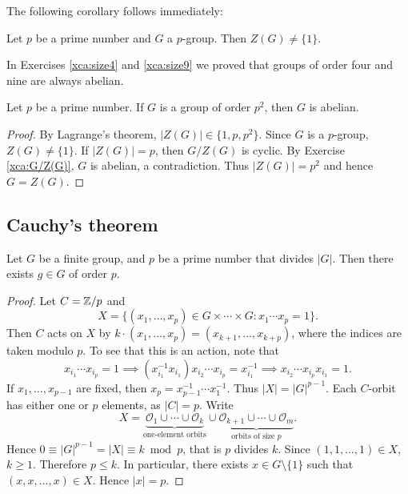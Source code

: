 The following corollary follows immediately: 

\begin{corollary}
Let $p$ be a prime number and 
$G$ a $p$-group. Then 
$Z(G)\ne\{1\}$.
\end{corollary}

In Exercises \ref{xca:size4} and \ref{xca:size9}
we proved that groups of order four and nine are always abelian. 

\begin{corollary}
    Let $p$ be a prime number. If $G$ is a group of order $p^2$, 
    then $G$ is abelian. 
\end{corollary}

\begin{proof}
By Lagrange's theorem, $|Z(G)|\in\{1,p,p^2\}$. Since $G$ 
is a $p$-group, $Z(G)\ne\{1\}$. If $|Z(G)|=p$, then $G/Z(G)$ 
is cyclic. By Exercise \ref{xca:G/Z(G)}, 
$G$ is abelian, a contradiction. 
Thus $|Z(G)|=p^2$ and hence $G=Z(G)$.
\end{proof}

\subsection{Cauchy's theorem}

\begin{theorem}[Cauchy]
\label{thm:Cauchy}
Let $G$ be a finite group, and $p$ be a prime number
that divides $|G|$. 
Then there exists $g\in G$ of order $p$.
\end{theorem}

\begin{proof}
Let $C=\mathbb{Z}/p$ and 
\[
X=\{(x_1,\dots,x_p)\in G\times\cdots\times G:x_1\cdots x_p=1\}.
\]
Then $C$ acts on $X$ by $k\cdot (x_1,\dots,x_p)=(x_{k+1},\dots,x_{k+p})$, where the indices are taken modulo $p$. To see that
this is an action, note that 
\[
x_{i_1}\cdots x_{i_p}=1
\implies (x_{i_1}^{-1}x_{i_1})x_{i_2}\cdots x_{i_p}=x_{i_1}^{-1}
\implies x_{i_2}\cdots x_{i_p}x_{i_1}=1.
\]
If $x_1,\dots,x_{p-1}$ are fixed, then 
$x_p=x_{p-1}^{-1}\cdots x_{1}^{-1}$. Thus $|X|=|G|^{p-1}$. Each $C$-orbit
has either one or $p$ elements, as $|C|=p$. Write
\[
X=\underbrace{\mathcal{O}_1\cup\cdots\cup \mathcal{O}_k}_{\text{one-element orbits}}\cup\underbrace{\mathcal{O}_{k+1}\cup\cdots\cup\mathcal{O}_m}_{\text{orbits of size $p$}}.
\]
Hence $0\equiv |G|^{p-1}=|X|\equiv k\bmod p$, that is $p$ divides $k$. Since $(1,1,\dots,1)\in X$, $k\geq 1$. Therefore $p\leq k$. In particular,
there exists $x\in G\setminus\{1\}$ such that $(x,x,\dots,x)\in X$. Hence $|x|=p$.
\end{proof}

